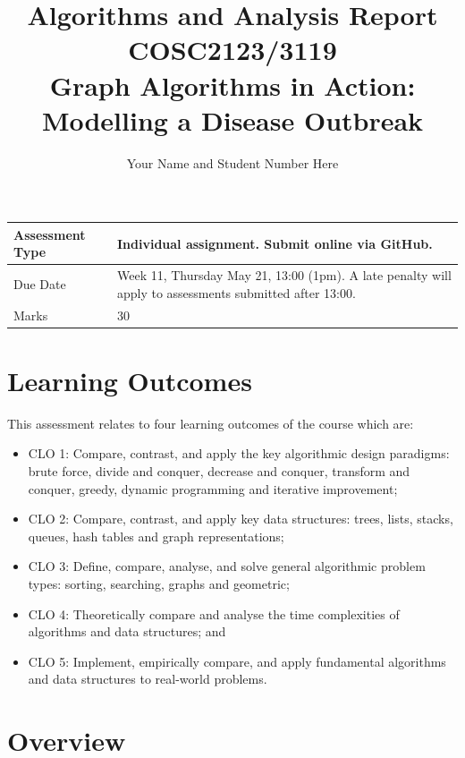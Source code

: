 \documentclass[12pt,a4paper]{article}
\title{\large{Algorithms and Analysis Report}
\\
COSC2123/3119
\\
Graph Algorithms in Action: Modelling a Disease Outbreak
} \vspace{-0.2cm}
\author{Your Name and Student Number Here}
\date{}
\begin{document}
\maketitle
\thispagestyle{firststyle}
\vspace{-1cm}

\begin{table}[h]
\begin{tabular}{|l|p{11cm}|}
\hline
{\color[HTML]{cc3333} Assessment Type} & Individual assignment. Submit online via GitHub. \\ \hline
{\color[HTML]{cc3333} Due Date}        & Week 11, Thursday May 21, 13:00 (1pm). A late penalty will apply to assessments submitted after 13:00. \\ \hline
{\color[HTML]{cc3333} Marks}           & 30 \\ \hline
\end{tabular}
\end{table}

\vspace{-0.7cm}
\section{Learning Outcomes}

This assessment relates to four learning outcomes of the course which are:
\begin{itemize}
    \item CLO 1: Compare, contrast, and apply the key algorithmic design paradigms: brute force, divide and conquer, decrease and conquer, transform and conquer, greedy, dynamic programming and iterative improvement;
    \item CLO 2: Compare, contrast, and apply key data structures: trees, lists, stacks, queues, hash tables and graph representations;
    \item CLO 3: Define, compare, analyse, and solve general algorithmic problem types: sorting, searching, graphs and geometric;
    \item CLO 4: Theoretically compare and analyse the time complexities of algorithms and data structures; and
    \item CLO 5: Implement, empirically compare, and apply fundamental algorithms and data structures to real-world problems.
\end{itemize}

\vspace{-0.4cm}
\section{Overview}
\end{document}
